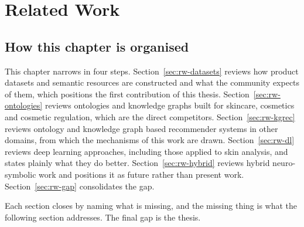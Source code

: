 %
%

\chapter{Related Work}
\label{ch:related}

\section{How this chapter is organised}
\label{sec:rw-organisation}

This chapter narrows in four steps. Section~\ref{sec:rw-datasets} reviews how
product datasets and semantic resources are constructed and what the community
expects of them, which positions the first contribution of this thesis.
Section~\ref{sec:rw-ontologies} reviews ontologies and knowledge graphs built
for skincare, cosmetics and cosmetic regulation, which are the direct
competitors. Section~\ref{sec:rw-kgrec} reviews ontology and knowledge graph
based recommender systems in other domains, from which the mechanisms of this
work are drawn. Section~\ref{sec:rw-dl} reviews deep learning approaches,
including those applied to skin analysis, and states plainly what they do
better. Section~\ref{sec:rw-hybrid} reviews hybrid neuro-symbolic work and
positions it as future rather than present work. Section~\ref{sec:rw-gap}
consolidates the gap.

Each section closes by naming what is missing, and the missing thing is what
the following section addresses. The final gap is the thesis.

